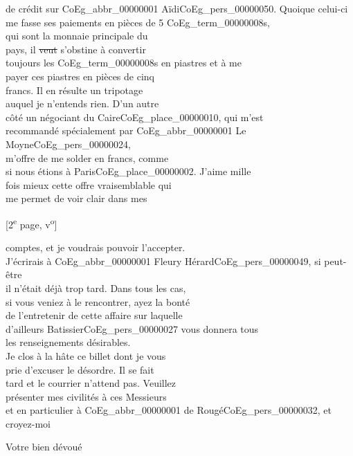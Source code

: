 \documentclass{book}
\begin{document}
de crédit sur \gls{CoEg_abbr_00000001} Aïdi\gls{CoEg_pers_00000050}. Quoique celui-ci\\
me fasse ses paiements en pièces de 5 \glspl{CoEg_term_00000008},\\
qui sont la monnaie principale du\\
pays, il \sout{veut} s’obstine à convertir\\
toujours les \glspl{CoEg_term_00000008} en piastres et à me\\
payer ces piastres en pièces de cinq\\
francs. Il en résulte un tripotage\\
auquel je n’entends rien. D’un autre\\
côté un négociant du Caire\gls{CoEg_place_00000010}, qui m’est\\
recommandé spécialement par \gls{CoEg_abbr_00000001} Le Moyne\gls{CoEg_pers_00000024},\\
m’offre de me solder en francs, comme\\
si nous étions à Paris\gls{CoEg_place_00000002}. J’aime mille\\
fois mieux cette offre vraisemblable qui\\
me permet de voir clair dans mes
{\footnotesize \begin{center} {[2\textsuperscript{e} page, v\textsuperscript{o}]}\end{center}}
\noindent comptes, et je voudrais pouvoir l’accepter.\\
J’écrirais à \gls{CoEg_abbr_00000001} Fleury Hérard\gls{CoEg_pers_00000049}, si peut-être\\
il n’était déjà trop tard. Dans tous les cas,\\
si vous veniez à le rencontrer, ayez la bonté\\
de l’entretenir de cette affaire sur laquelle\\
d’ailleurs Batissier\gls{CoEg_pers_00000027} vous donnera tous\\
les renseignements désirables.\\
\indent Je clos à la hâte ce billet dont je vous\\
prie d’excuser le désordre. Il se fait\\
tard et le courrier n’attend pas. Veuillez\\
présenter mes civilités à ces Messieurs\\
et en particulier à \gls{CoEg_abbr_00000001} de Rougé\gls{CoEg_pers_00000032}, et\\
croyez-moi
\begin{center} Votre bien dévoué\end{center}
\end{document}
